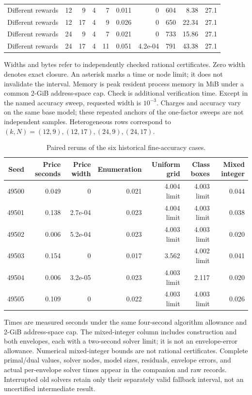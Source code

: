 \begin{table}[p]
\begin{tabular}{lrrrrrrrrr}
Different rewards & 12 & 9 & 4 & 7 & 0.011 & 0 & 604 & 8.38 & 27.1\\
Different rewards & 12 & 17 & 4 & 9 & 0.026 & 0 & 650 & 22.34 & 27.1\\
Different rewards & 24 & 9 & 4 & 7 & 0.021 & 0 & 733 & 15.86 & 27.1\\
Different rewards & 24 & 17 & 4 & 11 & 0.051 & 4.2e-04 & 791 & 43.38 & 27.1\\
\bottomrule\end{tabular}
\par\smallskip\begin{minipage}{0.98\textwidth}\small Widths and bytes refer to independently checked rational certificates. Zero width denotes exact closure. An asterisk marks a time or node limit; it does not invalidate the interval. Memory is peak resident process memory in MiB under a common 2-GiB address-space cap. Check is additional verification time. Except in the named accuracy sweep, requested width is $10^{-3}$. Charges and accuracy vary on the same base model; these repeated anchors of the one-factor sweeps are not independent samples. Heterogeneous rows correspond to $(k,N)=(12,9),(12,17),(24,9),(24,17)$.\end{minipage}\end{table}\clearpage
\begin{table}[p]\centering\small\setlength{\tabcolsep}{3pt}
\caption{Paired reruns of the six historical fine-accuracy cases.}\label{tab:fine54}
\begin{tabular}{rrrrrrr}\toprule
Seed & Price seconds & Price width & Enumeration & Uniform grid & Class boxes & Mixed integer\\\midrule
49500 & 0.049 & 0 & 0.021 & 4.004 limit & 4.003 limit & 0.044\\
49501 & 0.138 & 2.7e-04 & 0.023 & 4.004 limit & 4.003 limit & 0.038\\
49502 & 0.006 & 5.2e-04 & 0.023 & 4.003 limit & 4.003 limit & 0.020\\
49503 & 0.154 & 0 & 0.017 & 3.562 & 4.002 limit & 0.041\\
49504 & 0.006 & 3.2e-05 & 0.023 & 4.003 limit & 2.117 & 0.020\\
49505 & 0.109 & 0 & 0.022 & 4.003 limit & 4.003 limit & 0.026\\
\bottomrule\end{tabular}
\par\smallskip\begin{minipage}{0.98\textwidth}\small Times are measured seconds under the same four-second algorithm allowance and 2-GiB address-space cap. The mixed-integer column includes construction and both envelopes, each with a two-second solver limit; it is not an envelope-error allowance. Numerical mixed-integer bounds are not rational certificates. Complete primal/dual values, solver nodes, model sizes, residuals, envelope errors, and actual per-envelope solver times appear in the companion and raw records. Interrupted old solvers retain only their separately valid fallback interval, not an uncertified intermediate result.\end{minipage}\end{table}\clearpage

